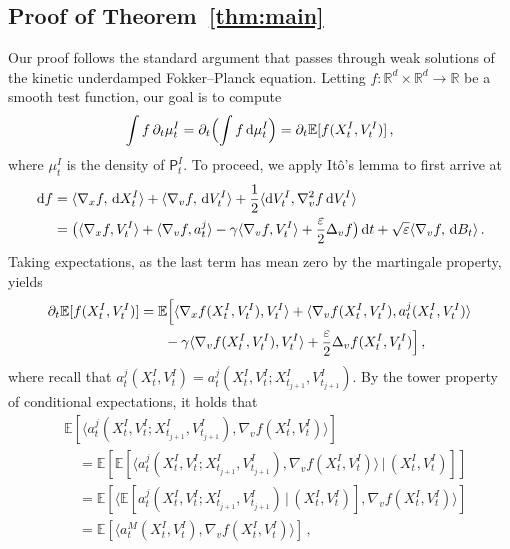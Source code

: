 \documentclass[12pt]{article}
\theoremstyle{plain}
\theoremstyle{plain}
\theoremstyle{remark}
\newcommand{\R}{\mathbb{R}}
\newcommand{\bbE}{\mathbb{E}}
\newcommand{\dd}{\,\mathrm{d}}
\newcommand{\eps}{\varepsilon}
\newcommand{\1}{\bm{1}}
\theoremstyle{plain}
\theoremstyle{definition}
\theoremstyle{remark}
\begin{document}
\subsection{Proof of Theorem~\ref{thm:main}}\label{proof_main}
Our proof follows the standard argument that passes through weak solutions of the kinetic underdamped Fokker--Planck equation. Letting $f : \R^d \times \R^d \to \R$ be a smooth test function, our goal is to compute
\begin{align*}
    \int f \,\partial_t \mu_t^I = \partial_t \Bigl(\int f \dd \mu_t^{I}\Bigr) = \partial_t \bbE[f(X_t^I,V_t^I)]\,,
\end{align*}
where $\mu_t^I$ is the density of $\mathsf P^I_t$. To proceed, we apply It\^o's lemma to first arrive at
\begin{align*}
        \dd f &= \langle \nabla_x f, \dd X_t^I \rangle + \langle \nabla_v f, \dd V_t^I\rangle + \frac{1}{2}\langle {\rm d} V_t^I, \nabla_{v}^2 f \dd V_t^I \rangle \\
        &= \bigl(\langle \nabla_x f, V_t^I \rangle + \langle \nabla_v f, a_t^j \rangle
        - \gamma \langle\nabla_v f, V_t^I \rangle +  \frac{\eps}{2}\Delta_v f\bigr)\dd t  + \sqrt\eps \langle \nabla_v f, \dd B_t\rangle\,.
    \end{align*}
Taking expectations, as the last term has mean zero by the martingale property, yields
\begin{align*}
    \partial_t \bbE[f(X_t^I,V_t^I)] &= \bbE\Bigl[ \langle \nabla_x f(X_t^I,V_t^I), V_t^I \rangle + \langle \nabla_v f(X_t^I,V_t^I), a_t^j(X_t^I,V_t^I) \rangle\\
    &\phantom{=}\quad - \gamma \langle\nabla_vf(X_t^I, V_t^I), V_t^I\rangle  + \frac{\eps}{2}\Delta_vf(X_t^I, V_t^I)\Bigr]\,,
\end{align*}
where recall that $a_t^j(X_t^I,V_t^I) = a_t^j(X_t^I, V_t^I; X_{t_{j+1}}^I, V_{t_{j+1}}^I)$. By the tower property of conditional expectations, it holds that
\begin{align*}
    &\bbE[\langle a_t^j(X_t^I, V_t^I; X_{t_{j+1}}^I, V_{t_{j+1}}^I), \nabla_v f(X_t^I,V_t^I) \rangle ] \\
    &\quad = \bbE[\bbE[\langle a_t^j(X_t^I, V_t^I; X_{t_{j+1}}^I, V_{t_{j+1}}^I), \nabla_v f(X_t^I,V_t^I) \rangle \,|\,(X_t^I,V_t^I)]] \\
    &\quad = \bbE[\langle \bbE[a_t^j(X_t^I, V_t^I; X_{t_{j+1}}^I, V_{t_{j+1}}^I)\,|\,(X_t^I,V_t^I)], \nabla_v f(X_t^I,V_t^I) \rangle ] \\
    &\quad = \bbE[\langle {a_t^{M}}(X_t^I,V_t^I), \nabla_v f(X_t^I,V_t^I) \rangle ]\,,
\end{align*}
\end{document}
